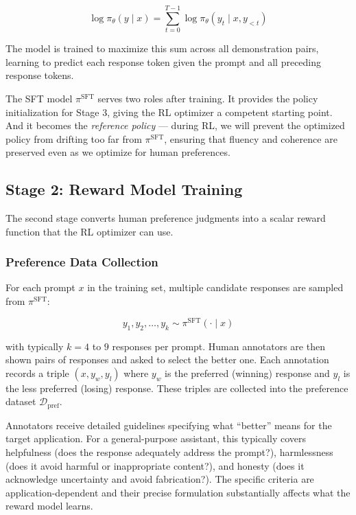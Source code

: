 \documentclass{book}
\begin{document}
\begin{equation}
\label{eq:sft_chain}
\log \pi_\theta(y \mid x)
= \sum_{t=0}^{T-1} \log \pi_\theta(y_t \mid x, y_{<t})
\end{equation}

The model is trained to maximize this sum across all demonstration pairs,
learning to predict each response token given the prompt and all preceding
response tokens.

The SFT model $\pi^{\text{SFT}}$ serves two roles after training. It
provides the policy initialization for Stage 3, giving the RL optimizer a
competent starting point. And it becomes the \emph{reference policy} ---
during RL, we will prevent the optimized policy from drifting too far from
$\pi^{\text{SFT}}$, ensuring that fluency and coherence are preserved even
as we optimize for human preferences.

\subsection{Stage 2: Reward Model Training}
\label{sec:reward_model}

The second stage converts human preference judgments into a scalar reward
function that the RL optimizer can use.

\subsubsection{Preference Data Collection}
\label{sec:preference_data}

For each prompt $x$ in the training set, multiple candidate responses are
sampled from $\pi^{\text{SFT}}$:

\begin{equation}
\label{eq:response_sampling}
y_1, y_2, \ldots, y_k \sim \pi^{\text{SFT}}(\cdot \mid x)
\end{equation}

with typically $k = 4$ to $9$ responses per prompt. Human annotators are
then shown pairs of responses and asked to select the better one. Each
annotation records a triple $(x, y_w, y_l)$ where $y_w$ is the preferred
(winning) response and $y_l$ is the less preferred (losing) response.
These triples are collected into the preference dataset
$\mathcal{D}_{\text{pref}}$.

Annotators receive detailed guidelines specifying what ``better'' means
for the target application. For a general-purpose assistant, this typically
covers helpfulness (does the response adequately address the prompt?),
harmlessness (does it avoid harmful or inappropriate content?), and honesty
(does it acknowledge uncertainty and avoid fabrication?). The specific
criteria are application-dependent and their precise formulation
substantially affects what the reward model learns.
\end{document}
